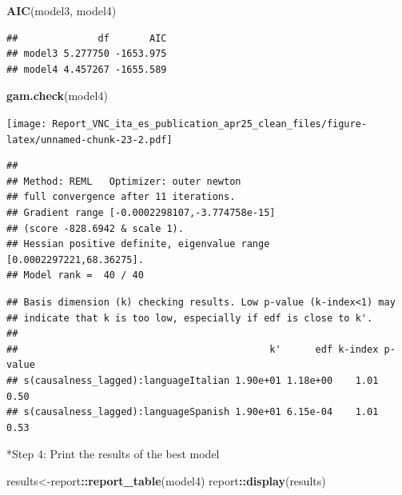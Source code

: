 \documentclass[
]{article}
\newenvironment{Shaded}{\begin{snugshade}}{\end{snugshade}}
\newcommand{\FunctionTok}[1]{\textcolor[rgb]{0.13,0.29,0.53}{\textbf{#1}}}
\newcommand{\NormalTok}[1]{#1}
\newcommand{\OtherTok}[1]{\textcolor[rgb]{0.56,0.35,0.01}{#1}}
\newcommand{\SpecialCharTok}[1]{\textcolor[rgb]{0.81,0.36,0.00}{\textbf{#1}}}
\begin{document}
\begin{Shaded}
\begin{Highlighting}[]
\FunctionTok{AIC}\NormalTok{(model3, model4)}
\end{Highlighting}
\end{Shaded}

\begin{verbatim}
##              df       AIC
## model3 5.277750 -1653.975
## model4 4.457267 -1655.589
\end{verbatim}

\begin{Shaded}
\begin{Highlighting}[]
\FunctionTok{gam.check}\NormalTok{(model4)}
\end{Highlighting}
\end{Shaded}

\texttt{[image: Report\_VNC\_ita\_es\_publication\_apr25\_clean\_files/figure-latex/unnamed-chunk-23-2.pdf]}

\begin{verbatim}
## 
## Method: REML   Optimizer: outer newton
## full convergence after 11 iterations.
## Gradient range [-0.0002298107,-3.774758e-15]
## (score -828.6942 & scale 1).
## Hessian positive definite, eigenvalue range [0.0002297221,68.36275].
## Model rank =  40 / 40
\end{verbatim}

\begin{verbatim}
## Basis dimension (k) checking results. Low p-value (k-index<1) may
## indicate that k is too low, especially if edf is close to k'.
## 
##                                            k'      edf k-index p-value
## s(causalness_lagged):languageItalian 1.90e+01 1.18e+00    1.01    0.50
## s(causalness_lagged):languageSpanish 1.90e+01 6.15e-04    1.01    0.53
\end{verbatim}

*Step 4: Print the results of the best model

\begin{Shaded}
\begin{Highlighting}[]
\NormalTok{results}\OtherTok{\textless{}{-}}\NormalTok{report}\SpecialCharTok{::}\FunctionTok{report\_table}\NormalTok{(model4)}
\NormalTok{report}\SpecialCharTok{::}\FunctionTok{display}\NormalTok{(results)}
\end{Highlighting}
\end{Shaded}
\end{document}
